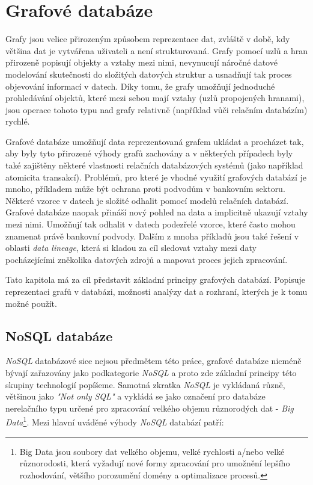 \chapter{Grafové databáze}
\label{sec:gdb}

Grafy jsou velice přirozeným způsobem reprezentace dat, zvláště v době, kdy většina dat je vytvářena uživateli a není strukturovaná. Grafy pomocí uzlů a hran přirozeně popisují objekty a vztahy mezi nimi, nevynucují náročné datové modelování skutečnosti do složitých datových struktur a usnadňují tak proces objevování informací v datech. Díky tomu, že grafy umožňují jednoduché prohledávání objektů, které mezi sebou mají vztahy (uzlů propojených hranami), jsou operace tohoto typu nad grafy relativně (například vůči relačním databázím) rychlé.

Grafové databáze umožňují data reprezentovaná grafem ukládat a procházet tak, aby byly tyto přirozené výhody grafů zachovány a v některých případech byly také zajištěny některé vlastnosti relačních databázových systémů (jako například atomicita transakcí). Problémů, pro které je vhodné využití grafových databází je mnoho, příkladem může být ochrana proti podvodům v bankovním sektoru. Některé vzorce v datech je složité odhalit pomocí modelů relačních databází. Grafové databáze naopak přináší nový pohled na data a implicitně ukazují vztahy mezi nimi. Umožňují tak odhalit v datech podezřelé vzorce, které často mohou znamenat právě bankovní podvody.\cite{Webber17} Dalším z mnoha příkladů jsou také řešení v oblasti \textit{data lineage}, která si kladou za cíl sledovat vztahy mezi daty pocházejícími zněkolika datových zdrojů a mapovat proces jejich zpracování.

Tato kapitola má za cíl představit základní principy grafových databází. Popisuje reprezentaci grafů v databázi, možnosti analýzy dat a rozhraní, kterých je k tomu možné použít.

\section{NoSQL databáze}
\label{sec:gdb-nosql}
\textit{NoSQL} databázové sice nejsou předmětem této práce, grafové databáze nicméně bývají zařazovány jako podkategorie \textit{NoSQL} a proto zde základní principy této skupiny technologií popíšeme. Samotná zkratka \textit{NoSQL} je vykládaná různě, většinou jako \textit{"Not only SQL"} \cite{Evans09} a vykládá se jako označení pro databáze nerelačního typu určené pro zpracování velkého objemu různorodých dat - \textit{Big Data}\footnote{Big Data jsou soubory dat velkého objemu, velké rychlosti a/nebo velké různorodosti, která vyžadují nové formy zpracování pro umožnění lepšího rozhodování, většího porozumění domény a optimalizace procesů.\cite{Laney01}}. Mezi hlavní uváděné výhody \textit{NoSQL} databází patří:

